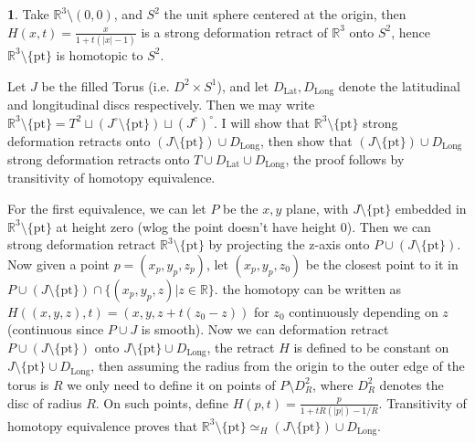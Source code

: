 \documentclass[10.5pt]{article}
\theoremstyle{definition}
\newtheorem{pb}{}
\newcommand{\set}[1]{\{#1\}}
\newcommand{\abs}[1]{\lvert#1\rvert}
\newcommand{\ism}{\simeq}
\begin{document}
    \newpage

    \begin{pb}
        Take \(\mathbb{R}^3 \setminus (0,0)\), and \(S^2\) the unit sphere centered at the origin, then \(H(x,t) = \frac{x}{1+t(\abs{x}-1)}\) is a strong deformation retract of
        \(\mathbb{R}^3\) onto \(S^2\), hence \(\mathbb{R}^3 \setminus \set{\text{pt}}\) is homotopic to \(S^2\).

        Let \(J \) be the filled Torus (i.e. \(D^2 \times S^1\)), and let \(D_\text{Lat}, D_\text{Long}\) denote the latitudinal and longitudinal discs respectively. 
        Then we may write \(\mathbb{R}^3 \setminus \set{\text{pt}} = T^2 \sqcup (J^\circ \setminus \set{\text{pt}}) \sqcup \left(J^c\right)^\circ\).
        I will show that \(\mathbb{R}^3 \setminus \set{\text{pt}}\) strong deformation retracts onto \((J \setminus \set{\text{pt}}) \cup D_\text{Long}\), then show that
        \((J \setminus \set{\text{pt}}) \cup D_\text{Long}\) strong deformation retracts onto \(T \cup D_\text{Lat} \cup D_\text{Long}\), the proof follows by transitivity of homotopy equivalence.

        For the first equivalence, we can let \(P\) be the \(x,y\) plane, with \(J \setminus \set{\text{pt}}\) embedded in \(\mathbb{R}^3 \setminus \set{\text{pt}}\) at height zero 
        (wlog the point doesn't have height 0). Then we can strong deformation retract \(\mathbb{R}^3 \setminus \set{\text{pt}}\) by projecting the z-axis onto \(P \cup (J \setminus \set{\text{pt}})\). 
        Now given a point \(p = (x_p,y_p,z_p)\), let \((x_p,y_p,z_0)\) be the closest point to it in \(P \cup (J \setminus \set{\text{pt}}) \cap \set{(x_p,y_p,z) \vert z \in \mathbb{R}}\).
        the homotopy can be written as \(H((x,y,z),t) = (x,y,z + t(z_0 - z))\) for \(z_0\) continuously depending on \(z\)(continuous since \(P \cup J\) is smooth). 
        Now we can deformation retract \(P \cup (J \setminus \set{\text{pt}})\) onto \(J \setminus \set{\text{pt}} \cup D_{\text{Long}}\),
        the retract \(H\) is defined to be constant on \(J \setminus \set{\text{pt}} \cup D_{\text{Long}}\), then assuming the radius from the origin to the outer edge of the torus is \(R\)
        we only need to define it on points of \(P \setminus D^2_R\), where \(D^2_R\) denotes the disc of radius \(R\). On such points, define \(H(p,t) = \frac{p}{1 + tR(\abs{p}) - 1/R}\).
        Transitivity of homotopy equivalence proves that \(\mathbb{R}^3 \setminus \set{\text{pt}} \ism_{H} (J \setminus \set{\text{pt}}) \cup D_\text{Long}\).
        

\end{pb}
\end{document}
